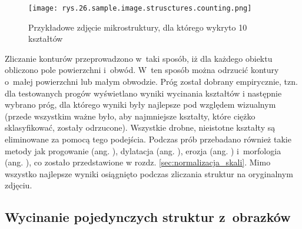 \begin{figure}[h]
    \centering
    \texttt{[image: rys.26.sample.image.strusctures.counting.png]}
    \caption{Przykładowe zdjęcie mikrostruktury, dla którego wykryto 10 kształtów}
    \label{fig:mesh25}
\end{figure}
Zliczanie konturów przeprowadzono w~taki sposób, iż dla każdego obiektu obliczono pole powierzchni i~obwód. W~ten sposób można odrzucić kontury o~małej powierzchni lub małym obwodzie. Próg został dobrany empirycznie, tzn. dla testowanych progów wyświetlano wyniki wycinania kształtów i następnie wybrano próg, dla którego wyniki były najlepsze pod względem wizualnym (przede wszystkim ważne było, aby najmniejsze kształty, które ciężko sklasyfikować, zostały odrzucone). Wszystkie drobne, nieistotne kształty są eliminowane za pomocą tego podejścia. Podczas prób przebadano również takie metody jak progowanie (ang. ), dylatacja (ang. ), erozja (ang. ) i~morfologia (ang. ), co zostało przedstawione w rozdz. \ref{sec:normalizacja_skali}. Mimo wszystko najlepsze wyniki osiągnięto podczas zliczania struktur na oryginalnym zdjęciu.

\subsection{Wycinanie pojedynczych struktur z~obrazków}
\label{wycinanie.struktur}

